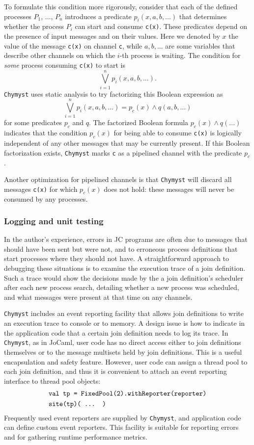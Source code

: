 \documentclass[sigplan,10pt]{acmart}\settopmatter{}
\begin{document}
To formulate this condition more rigorously, consider that each of
the defined processes $P_{1}$, ..., $P_{n}$ introduces a predicate
$p_{i}(x,a,b,...)$ that determines whether the process $P_{i}$ can
start and consume \texttt{c(x)}. These predicates depend on the presence
of input messages and on their values. Here we denoted by $x$ the
value of the message \texttt{c(x)} on channel \texttt{c}, while $a,b,...$
are some variables that describe other channels on which the $i$-th
process is waiting. The condition for \emph{some} process consuming
\texttt{c(x)} to start is
\[
\bigvee_{i=1}^{n}p_{i}(x,a,b,...).
\]
 \texttt{Chymyst} uses static analysis to try factorizing this Boolean
expression as
\[
\bigvee_{i=1}^{n}p_{i}(x,a,b,...)=p_{c}(x)\wedge q(a,b,...)
\]
for some predicates $p_{c}$ and $q$. The factorized Boolean formula
$p_{c}(x)\wedge q(...)$ indicates that the condition $p_{c}(x)$
for being able to consume \texttt{c(x)} is logically independent of
any other messages that may be currently present. If this Boolean
factorization exists, \texttt{Chymyst} marks \texttt{c} as a pipelined
channel with the predicate $p_{c}$. 

Another optimization for pipelined channels is that \texttt{Chymyst}
will discard all messages \texttt{c(x)} for which $p_{c}(x)$ does
not hold: these messages will never be consumed by any processes.

\subsubsection{Logging and unit testing}

In the author's experience, errors in JC programs are often due to
messages that should have been sent but were not, and to erroneous
process definitions that start processes where they should not have.
A straightforward approach to debugging these situations is to examine
the execution trace of a join definition. Such a trace would show
the decisions made by the a join definition's scheduler after each
new process search, detailing whether a new process was scheduled,
and what messages were present at that time on any channels.

\texttt{Chymyst} includes an event reporting facility that allows
join definitions to write an execution trace to console or to memory.
A design issue is how to indicate in the application code that a certain
join definition needs to log its trace. In \texttt{Chymyst}, as in
JoCaml, user code has no direct access either to join definitions
themselves or to the message multisets held by join definitions. This
is a useful encapsulation and safety feature. However, user code can
assign a thread pool to each join definition, and thus it is convenient
to attach an event reporting interface to thread pool objects:
\begin{align*}
 & \text{\texttt{val tp = FixedPool(2).withReporter(reporter)}}\\
 & \text{\texttt{site(tp)( ... )}}
\end{align*}
Frequently used event reporters are supplied by \texttt{Chymyst},
and application code can define custom event reporters. This facility
is suitable for reporting errors and for gathering runtime performance
metrics. 
\end{document}
